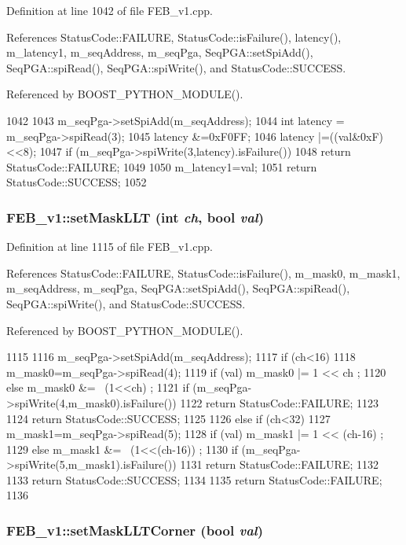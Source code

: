 Definition at line 1042 of file FEB\_\-v1.cpp.

References StatusCode::FAILURE, StatusCode::isFailure(), latency(), m\_\-latency1, m\_\-seqAddress, m\_\-seqPga, SeqPGA::setSpiAdd(), SeqPGA::spiRead(), SeqPGA::spiWrite(), and StatusCode::SUCCESS.

Referenced by BOOST\_\-PYTHON\_\-MODULE().


\begin{DoxyCode}
1042                                            {
1043   m_seqPga->setSpiAdd(m_seqAddress);
1044   int latency = m_seqPga->spiRead(3);
1045   latency &=0xF0FF;
1046   latency |=((val&0xF)<<8);
1047    if (m_seqPga->spiWrite(3,latency).isFailure()){
1048     return StatusCode::FAILURE;
1049   }
1050    m_latency1=val;
1051   return StatusCode::SUCCESS;   
1052 }
\end{DoxyCode}
\hypertarget{classFEB__v1_a5a177c98b2be429aacbb3d652f40b247}{
\subsubsection[{setMaskLLT}]{ FEB\_\-v1::setMaskLLT (int {\em ch}, \/  bool {\em val})}}
\label{classFEB__v1_a5a177c98b2be429aacbb3d652f40b247}


Definition at line 1115 of file FEB\_\-v1.cpp.

References StatusCode::FAILURE, StatusCode::isFailure(), m\_\-mask0, m\_\-mask1, m\_\-seqAddress, m\_\-seqPga, SeqPGA::setSpiAdd(), SeqPGA::spiRead(), SeqPGA::spiWrite(), and StatusCode::SUCCESS.

Referenced by BOOST\_\-PYTHON\_\-MODULE().


\begin{DoxyCode}
1115                                              {
1116   m_seqPga->setSpiAdd(m_seqAddress);
1117   if (ch<16) {
1118     m_mask0=m_seqPga->spiRead(4);
1119     if (val)  m_mask0 |= 1 << ch  ;
1120     else      m_mask0 &= ~(1<<ch) ;
1121         if (m_seqPga->spiWrite(4,m_mask0).isFailure()){
1122       return StatusCode::FAILURE;
1123     }
1124     return StatusCode::SUCCESS;  
1125   }
1126   else if (ch<32) {
1127     m_mask1=m_seqPga->spiRead(5);
1128     if (val)  m_mask1 |= 1 << (ch-16)  ;
1129     else      m_mask1 &= ~(1<<(ch-16)) ;
1130     if (m_seqPga->spiWrite(5,m_mask1).isFailure()){
1131       return StatusCode::FAILURE;
1132     }
1133     return StatusCode::SUCCESS;  
1134   }
1135   return StatusCode::FAILURE;  
1136 }
\end{DoxyCode}
\hypertarget{classFEB__v1_ad078f7c2086dd78375da9d9d82b78d23}{
\subsubsection[{setMaskLLTCorner}]{ FEB\_\-v1::setMaskLLTCorner (bool {\em val})}}
\label{classFEB__v1_ad078f7c2086dd78375da9d9d82b78d23}


